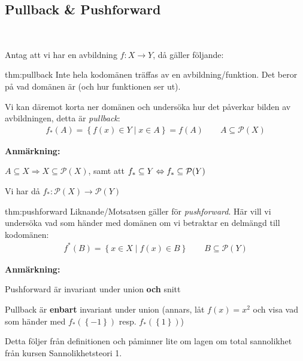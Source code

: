 \subsection{Pullback \& Pushforward}\hfill\\\par
\noindent Antag att vi har en avbildning $f: X\to Y$, då gäller följande:
\par\bigskip
\begin{theo}[Pullback]{thm:pullback}
  Inte hela kodomänen träffas av en avbildning/funktion. Det beror på vad domänen är (och hur funktionen ser ut).\par
  \noindent Vi kan däremot korta ner domänen och undersöka hur det påverkar bilden av avbildningen, detta är \textit{pullback}:
  \begin{equation*}
    \begin{gathered}
      f_*(A) = \left\{f(x)\in Y\;|\; x\in A\right\} = f(A)\qquad A\subseteq\mathcal{P}(X)
    \end{gathered}
  \end{equation*}
  \par\bigskip
  \noindent\textbf{Anmärkning:}\par
  $A\subseteq X\Rightarrow X\subseteq\mathcal{P}(X)$, samt att $f_*\subseteq Y\Leftrightarrow f_*\subseteq\mathcal{P}(Y)$\par
  Vi har då $f_*:\mathcal{P}(X)\to\mathcal{P}(Y)$
\end{theo}
\par\bigskip
\begin{theo}[Pushforward]{thm:pushforward}
  Liknande/Motsatsen gäller för \textit{pushforward}. Här vill vi undersöka vad som händer med domänen om vi betraktar en delmängd till kodomänen:
  \begin{equation*}
    \begin{gathered}
      f^*(B) = \left\{x\in X\;|\; f(x)\in B\right\}\qquad B\subseteq\mathcal{P}(Y)
    \end{gathered}
  \end{equation*}
\end{theo}
\par\bigskip
\noindent\textbf{Anmärkning:}\par
\noindent Pushforward är invariant under union \textbf{och} snitt\par
\noindent Pullback är \textbf{enbart} invariant under union (annars, låt $f(x) = x^2$ och visa vad som händer med $f_*(\left\{-1\right\})$ resp. $f_*(\left\{1\right\})$)
\par\bigskip
\noindent Detta följer från definitionen och påminner lite om lagen om total sannolikhet från kursen Sannolikhetsteori 1.
\par\bigskip
